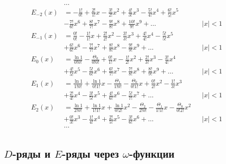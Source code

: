 \begin{equation*} \begin{aligned}
&\ldots \\
%
E_{-2}(x) &= 
- \frac{1!}{0!}
+ \frac{2!}{1!} x
- \frac{3!}{2!} x^2
+ \frac{4!}{3!} x^3
- \frac{5!}{4!} x^4
+ \frac{6!}{5!} x^5 \\ &
- \frac{7!}{6!} x^6
+ \frac{8!}{7!} x^7
- \frac{9!}{8!} x^8
+ \frac{10!}{9!} x^9
+ \ldots & 
&|x| < 1 \\
%
E_{-1}(x) &=  
  \frac{0!}{0!}
- \frac{1!}{1!} x
+ \frac{2!}{2!} x^2
- \frac{3!}{3!} x^3
+ \frac{4!}{4!} x^4
- \frac{5!}{5!} x^5 \\ &
+ \frac{6!}{6!} x^6
- \frac{7!}{7!} x^7
+ \frac{8!}{8!} x^8
- \frac{9!}{9!} x^9
+ \ldots & 
&|x| < 1 \\
%
E_0(x) &=
  \frac{\ln{1}}{0!0!}
- \frac{\Theta_0}{0!0!}
+ \frac{0!}{1!} x 
- \frac{1!}{2!} x^2
+ \frac{2!}{3!} x^3
- \frac{3!}{4!} x^4 \\ &
+ \frac{4!}{5!} x^5
- \frac{5!}{6!} x^6
+ \frac{6!}{7!} x^7
- \frac{7!}{8!} x^8
+ \frac{8!}{9!} x^9
+ \ldots & 
&|x| < 1 \\
%
E_1(x) &=
  \frac{\ln{1}}{1!0!} 
+ \frac{\ln{1}}{0!1!} x 
- \frac{\Theta_1}{1!0!}
- \frac{\Theta_0}{0!1!} x
+ \frac{0!}{2!} x^2
- \frac{1!}{3!} x^3 \\ &
+ \frac{2!}{4!} x^4
- \frac{3!}{5!} x^5
+ \frac{4!}{6!} x^6
- \frac{5!}{7!} x^7
+ \ldots & 
&|x| < 1 \\
%
E_2(x) &=
  \frac{\ln{1}}{2!0!}
+ \frac{\ln{1}}{1!1!} x
+ \frac{\ln{1}}{0!2!} x^2
- \frac{\Theta_2}{2!0!}
- \frac{\Theta_1}{1!1!} x
- \frac{\Theta_0}{0!2!} x^2 \\ &
+ \frac{0!}{3!} x^3
- \frac{1!}{4!} x^4
+ \frac{2!}{5!} x^5
- \frac{3!}{6!} x^6
+ \ldots & 
&|x| < 1 \\
%
&\ldots \\
\end{aligned} \end{equation*}

\subsection{$D$-ряды и $E$-ряды через $\omega$-функции}

